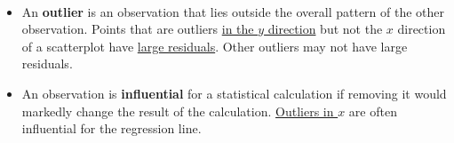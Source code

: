 \documentclass[Main.tex]{subfiles}
\begin{document}
	\begin{exercise} \hfill \\
		\begin{itemize}
			\item An \textbf{outlier} is an observation that lies outside the overall pattern of the other observation. Points that are outliers \underline{in the $y$ direction} but not the $x$ direction of a scatterplot have \underline{large residuals}. Other outliers may not have large residuals.\\
			\item An observation is \textbf{influential} for a statistical calculation if removing it would markedly change the result of the calculation. \underline{Outliers in $x$} are often influential for the regression line.
		\end{itemize}
	\end{exercise}		
\end{document}
